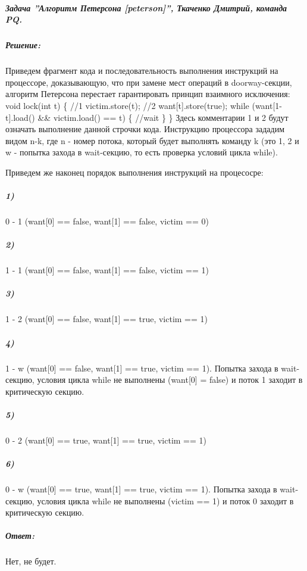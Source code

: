 \documentclass{article}
\begin{document}
\subparagraph{\textit{ Задача ''Алгоритм Петерсона [peterson]'', Ткаченко Дмитрий, команда PQ.}}

\subparagraph{Решение:} Приведем фрагмент кода и последовательность выполнения инструкций на процессоре, доказывающую, что при замене мест операций в doorway-секции, алгоритм Петерсона перестает гарантировать принцип взаимного исключения:
\newline
void lock(int t) \{
\newline
//1	victim.store(t);
\newline
//2 want[t].store(true);
\newline
	while (want[1-t].load() && victim.load() == t) \{
	\newline
		//wait
		\newline
	\}
	\newline
\} 
\newline 
Здесь комментарии 1 и 2 будут означать выполнение данной строчки кода. Инструкцию процессора зададим видом n-k, где n - номер потока, который будет выполнять команду k (это 1, 2 и w - попытка захода в wait-секцию, то есть проверка условий цикла while).

Приведем же наконец порядок выполнения инструкций на процесосре:
\newline
\subparagraph{1)} 0 - 1 (want[0] == false, want[1] == false, victim == 0)
\subparagraph{2)} 1 - 1 (want[0] == false, want[1] == false, victim == 1)
\subparagraph{3)} 1 - 2 (want[0] == false, want[1] == true, victim == 1)
\subparagraph{4)} 1 - w (want[0] == false, want[1] == true, victim == 1). Попытка захода в wait-секцию, условия цикла while не выполнены (want[0] = false) и поток 1 заходит в критическую секцию.
\subparagraph{5)} 0 - 2 (want[0] == true, want[1] == true, victim == 1)
\subparagraph{6)} 0 - w (want[0] == true, want[1] == true, victim == 1).
Попытка захода в wait-секцию, условия цикла while не выполнены (victim == 1) и поток 0 заходит в критическую секцию.
\newline
\newline
{}
\subparagraph{Ответ:} Нет, не будет.
\end{document}
